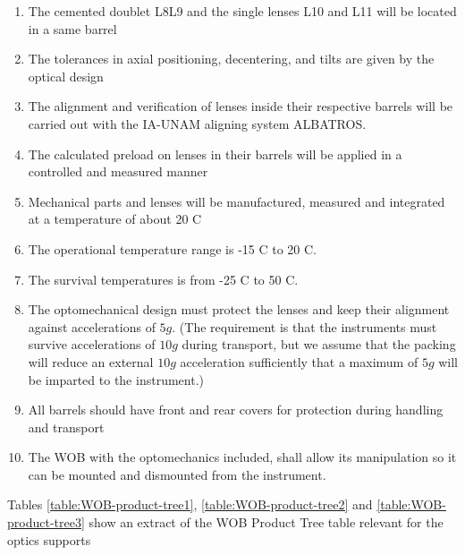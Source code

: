 \documentclass{report}
\begin{document}
\begin{enumerate}
\item The cemented doublet L8L9 and the single lenses L10 and L11 will be located in a same barrel 
\item The tolerances in axial positioning, decentering, and tilts are given by the optical design
\item The alignment and verification of lenses inside their respective barrels will be carried out with the IA-UNAM aligning system ALBATROS.
\item The calculated preload on lenses in their barrels will be applied in a controlled and measured manner 
\item Mechanical parts and lenses will be manufactured, measured and integrated at a temperature of about 20 C
\item The operational temperature range is -15 C to 20 C.
\item The survival temperatures is from -25 C to 50 C.
\item The optomechanical design must protect the lenses and keep their alignment against accelerations of $5g$. (The requirement is that the instruments must survive accelerations of $10g$ during transport, but we assume that the packing will reduce an external $10g$ acceleration sufficiently that a maximum of $5g$ will be imparted to the instrument.)
\item All barrels should have front and rear covers for protection during handling and transport
\item The WOB with the optomechanics included, shall allow its manipulation so it can be mounted and dismounted from the instrument.
\end{enumerate}

Tables \ref{table:WOB-product-tree1}, \ref{table:WOB-product-tree2} and \ref{table:WOB-product-tree3} show an extract of the WOB Product Tree table relevant for the optics supports
\end{document}

